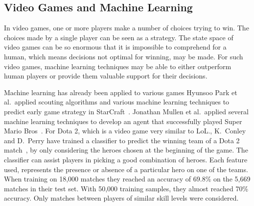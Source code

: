 \subsection{Video Games and Machine Learning}\label{sec:mlandonlinevideogames}
In video games, one or more players make a number of choices trying to win. The choices made by a single player can be seen as a strategy.
The state space of video games can be so enormous that it is impossible to comprehend for a human, which means decisions not optimal for winning, may be made.
For such video games, machine learning techniques may be able to either outperform human players or provide them valuable support for their decisions.

Machine learning has already been applied to various games Hyunsoo Park et al.\ applied scouting algorithms and various machine learning techniques to predict early game strategy in StarCraft~\cite{Park:2012:PES:2425296.2425298}. Jonathan Mullen et al.\ applied several machine learning techniques to develop an agent that successfully played Super Mario Bros~\cite{supermario}. 
For Dota 2, which is a video game very similar to LoL.\@, 
K.\ Conley and D.\ Perry have trained a classifier to predict the winning team of a Dota 2 match~\cite{dota2article}, by only considering the heroes chosen at the beginning of the game. The classifier can assist players in picking a good combination of heroes.
Each feature used, represents the presence or absence of a particular hero on one of the teams.
When training on 18,000 matches they reached an accuracy of 69.8\% on the 5,669 matches in their test set.
With 50,000 training samples, they almost reached 70\% accuracy. Only matches between players of similar skill levels were considered.

%
%



